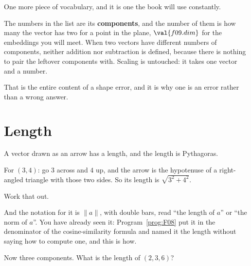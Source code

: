 \begin{fr}
One more piece of vocabulary, and it is one the book will use constantly.

The numbers in the list are its \textbf{components}, and the number of them is
how many the vector has \dash{} two for a point in the plane,
$\val{f09.dim}$ for the embeddings you will meet. When two vectors have
different numbers of components, neither addition nor subtraction is
defined, because there is nothing to pair the leftover components with.
Scaling is untouched: it takes one vector and a number.

That is the entire content of a shape error, and it is why one is an error
rather than a wrong answer.
\end{fr}

\section{Length}
\label{sec:F09-length}

\begin{fr}
A vector drawn as an arrow has a length, and the length is Pythagoras.

For $(3, 4)$: go $3$ across and $4$ up, and the arrow is the hypotenuse of a
right-angled triangle with those two sides. So its length is
$\sqrt{3^{2} + 4^{2}}$.

Work that out.
\nextframe
\end{fr}

\begin{fr}
And the notation for it is $\lVert a \rVert$, with double bars, read
\enquote{the length of $a$} or \enquote{the norm of $a$}. You have already
seen it: Program~\ref{prog:F08} put it in the denominator of the
cosine-similarity formula and named it the length without saying how to
compute one, and this is how.

Now three components. What is the length of $(2, 3, 6)$?
\dotline
\nextframe
\end{fr}

